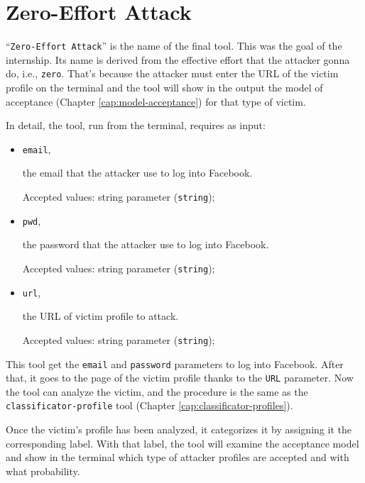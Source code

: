 \newpage
\section{Zero-Effort Attack}
\label{cap:zero-effort-attack}
``\texttt{Zero-Effort Attack}'' is the name of the final tool. This was the goal of the internship. Its name is derived from the effective effort that the attacker gonna do, i.e., \texttt{zero}. That's because the attacker must enter the URL of the victim profile on the terminal and the tool will show in the output the model of acceptance (Chapter \ref{cap:model-acceptance}) for that type of victim.
\par \noindent In detail, the tool, run from the terminal, requires as input:
\begin{itemize}
	\item \texttt{email},\par \noindent the email that the attacker use to log into Facebook.\par \noindent Accepted values: string parameter (\texttt{string});
	
	\item \texttt{pwd},\par \noindent the password that the attacker use to log into Facebook.\par \noindent Accepted values: string parameter (\texttt{string});
	
	\item \texttt{url},\par \noindent the URL of victim profile to attack.\par \noindent Accepted values: string parameter (\texttt{string});
\end{itemize}
This tool get the \texttt{email} and \texttt{password} parameters to log into Facebook. After that, it goes to the page of the victim profile thanks to the \texttt{URL} parameter.
Now the tool can analyze the victim, and the procedure is the same as the \texttt{classificator-profile} tool (Chapter \ref{cap:classificator-profiles}).
\par \noindent Once the victim's profile has been analyzed, it categorizes it by assigning it the corresponding label. With that label, the tool will examine the acceptance model and show in the terminal which type of attacker profiles are accepted and with what probability.
